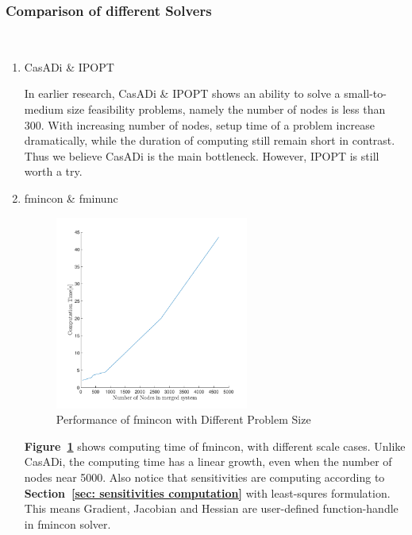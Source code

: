 \documentclass{article}
\begin{document}
\subsubsection{Comparison of different Solvers}~\label{sec: comparison of solvers}

\begin{enumerate}
\item CasADi \& IPOPT

In earlier research, CasADi \& IPOPT shows an ability to solve a small-to-medium size feasibility problems, namely the number of nodes is less than 300. With increasing number of nodes, setup time of a problem increase dramatically, while the duration of computing still remain  short in contrast. Thus we believe CasADi is the main bottleneck. However, IPOPT is still worth a try.

\item fmincon \& fminunc

\begin{figure}[hbt!]
 \begin{center}
    \includegraphics[width=0.6\textwidth]{Simulation_Results/Performance_of_fmincon.pdf}
    \caption{Performance of fmincon with Different Problem Size}
    \label{fig:performance of fmincon}
 \end{center}
\end{figure}

\textbf{Figure~\ref{fig:performance of fmincon}} shows computing time of fmincon, with different scale cases. Unlike CasADi, the computing time has a linear growth, even when the number of nodes near 5000. Also notice that sensitivities are computing according to \textbf{Section~\ref{sec: sensitivities computation}} with least-squres formulation. This means Gradient, Jacobian and Hessian are user-defined function-handle in fmincon solver.


\end{enumerate}
\end{document}
